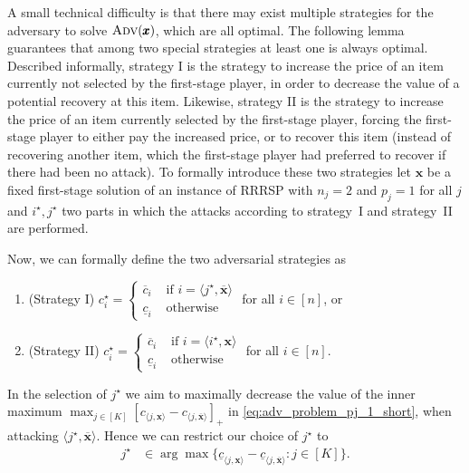 A small technical difficulty is that there may exist multiple strategies for the adversary to solve $\textsc{Adv}(\pmb{x})$, which are all optimal. The following lemma guarantees that among two special strategies at least one is always optimal. Described informally, strategy I is the strategy to increase the price of an item currently not selected by the first-stage player, in order to decrease the value of a potential recovery at this item. Likewise, strategy II is the strategy to increase the price of an item currently selected by the first-stage player, forcing the first-stage player to either pay the increased price, or to recover this item (instead of recovering another item, which the first-stage player had preferred to recover if there had been no attack).
To formally introduce these two strategies let $\pmb{x}$ be a fixed first-stage solution of an 
instance of RRRSP with $n_j=2$ and $p_j = 1$ for all $j$ and $i^\star, j^\star$ 
two parts in which the attacks according to strategy~I and strategy~II are performed.

Now, we can formally define the two adversarial strategies as
\begin{enumerate}
  \item (Strategy I) $c^\star_i = \begin{cases}
  \overline{c}_i & \text{ if } i = \langle j^\star,\overline{\pmb{x}}\rangle \\
  \underline{c}_i & \text{ otherwise } 
  \end{cases} $ for all $i\in [n]$, or
  
  \item (Strategy II) $c^\star_i = \begin{cases}
  \overline{c}_i & \text{ if } i = \langle i^\star, \pmb{x} \rangle \\
  \underline{c}_i & \text{ otherwise } 
  \end{cases} $ for all $i\in[n]$.
\end{enumerate}

In the selection of $j^\star$ we aim to maximally decrease the value of the inner maximum 
$\max_{j\in[K]} [c_{\langle j, \pmb{x} \rangle} - c_{\langle j, \overline{\pmb{x}} \rangle}]_+$
in \cref{eq:adv_problem_pj_1_short}, when attacking $\langle j^\star,\overline{\pmb{x}}\rangle$.
Hence we can restrict our choice of $j^\star$ to
\begin{align}
  j^\star &\in \arg\max \{ \underline{c}_{\langle j, \pmb{x}\rangle} - \underline{c}_{\langle j, \overline{\pmb{x}} \rangle} : j\in[K] \}. \label{eq:jstar}
\end{align}

